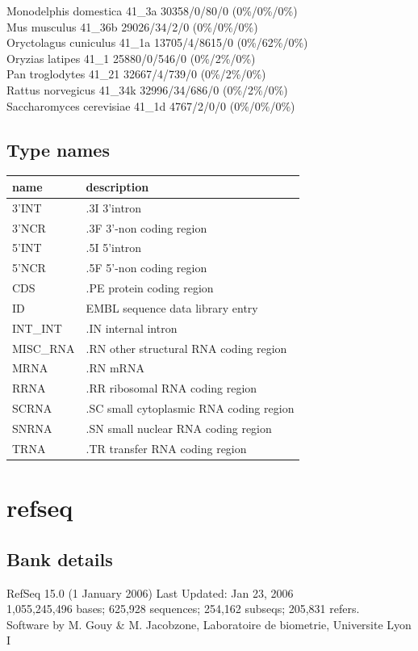 \documentclass{article}
\begin{document}
\begin{Schunk}
Monodelphis domestica                   41\_3a 30358/0/80/0 (0\%/0\%/0\%)\\
Mus musculus                            41\_36b 29026/34/2/0 (0\%/0\%/0\%)\\
Oryctolagus cuniculus                   41\_1a 13705/4/8615/0 (0\%/62\%/0\%)\\
Oryzias latipes                         41\_1 25880/0/546/0 (0\%/2\%/0\%)\\
Pan troglodytes                         41\_21 32667/4/739/0 (0\%/2\%/0\%)\\
Rattus norvegicus                       41\_34k 32996/34/686/0 (0\%/2\%/0\%)\\
Saccharomyces cerevisiae                41\_1d 4767/2/0/0 (0\%/0\%/0\%)

\subsection{Type names}
\noindent\begin{tabular}{ll}
\hline \hline
name & description\\
\hline
3'INT & .3I 3'intron \\
3'NCR & .3F  3'-non coding region \\
5'INT & .5I 5'intron \\
5'NCR & .5F  5'-non coding region \\
CDS & .PE protein coding region \\
ID & EMBL sequence data library entry \\
INT\_INT & .IN  internal intron \\
MISC\_RNA & .RN other structural RNA coding region \\
MRNA & .RN mRNA \\
RRNA & .RR ribosomal RNA coding region \\
SCRNA & .SC small cytoplasmic RNA coding region \\
SNRNA & .SN small nuclear RNA coding region \\
TRNA & .TR transfer RNA coding region \\
\hline \hline
\end{tabular}

\section{ refseq }
\subsection{Bank details}
RefSeq 15.0 (1 January 2006) Last Updated: Jan 23, 2006\\
1,055,245,496 bases; 625,928 sequences; 254,162 subseqs; 205,831 refers.\\
Software by M. Gouy \& M. Jacobzone, Laboratoire de biometrie, Universite Lyon I


\end{Schunk}
\end{document}
